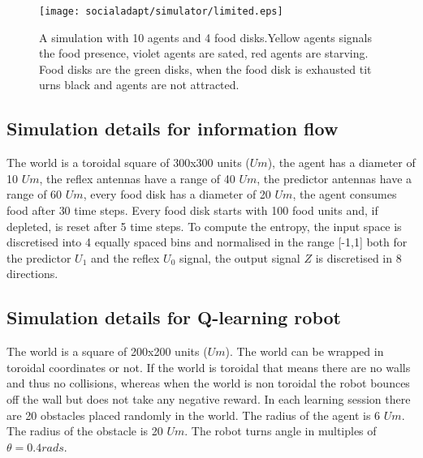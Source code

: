 \begin{figure}[htb]
\begin{centering}
\texttt{[image: socialadapt/simulator/limited.eps]}
\small{
\caption[Software simulation in Enki B]{A simulation with 10 agents and 4 food disks.Yellow agents signals the
food presence, violet agents are sated, red agents are starving.
Food disks are the green disks, when the food disk is exhausted tit urns black
and agents are not attracted. \label{fig:screen2}}
}
\end{centering}
\end{figure}

\subsection{Simulation details for information flow \label{Appendix:InfoFlowSimDetails}}

The world is a toroidal square of 300x300 units ($Um$), the agent has a diameter of 10 $Um$,
the reflex antennas have a range of 40 $Um$, the predictor antennas have a range of 60 $Um$,
every food disk has a diameter of 20 $Um$, the agent consumes food after $30$ time steps.
Every food disk starts with 100 food units and, if depleted, is reset after 5 time steps.
To compute the entropy, the input space is discretised into 4 equally spaced bins
and normalised in the range [-1,1]
both for the predictor $U_1$ and the reflex $U_0$ signal, the output signal $Z$
is discretised in 8 directions.

\subsection{Simulation details for Q-learning robot \label{Appendix:QLearnSimDetails}}

The world is a square of 200x200 units ($Um$). The world can be wrapped
in toroidal coordinates or not.
If the world is toroidal that means there are no walls and thus no collisions,
whereas when the world is non toroidal the robot bounces off the wall but
does not take any negative reward.
In each learning session there are 20 obstacles placed randomly in the world.
The radius of the agent is 6 $Um$. The radius of the obstacle is 20 $Um$.
The robot turns angle in multiples of $\theta=0.4 rads$.

